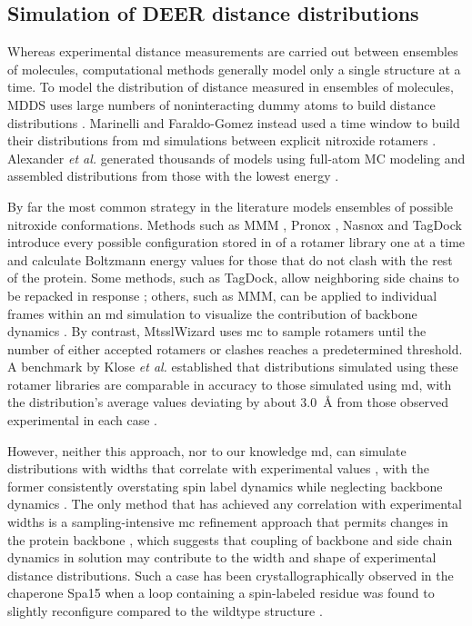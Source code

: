 \subsection{Simulation of DEER distance distributions}

Whereas experimental distance measurements are carried out between ensembles of molecules, computational methods generally model only a single structure at a time. To model the distribution of distance measured in ensembles of molecules, MDDS uses large numbers of noninteracting dummy atoms to build distance distributions \citep*{Kazmier2014a, Raghuraman2014}. Marinelli and Faraldo-Gomez instead used a time window to build their distributions from \gls{md} simulations between explicit nitroxide rotamers \citep*{Hustedt2018, Marinelli2015, Marinelli2019}. Alexander \emph{et al.} generated thousands of models using full-atom MC modeling and assembled distributions from those with the lowest energy \citep*{Alexander2013}.

By far the most common strategy in the literature models ensembles of possible nitroxide conformations. Methods such as MMM \citep*{Jeschke2018, Polyhach2011}, Pronox \citep*{Hatmal2012}, Nasnox \citep*{Beasley2015, Price2007, Tangprasertchai2015} and TagDock \citep*{Edwards2014} introduce every possible configuration stored in of a rotamer library one at a time and calculate Boltzmann energy values for those that do not clash with the rest of the protein. Some methods, such as TagDock, allow neighboring side chains to be repacked in response \citep*{Edwards2014}; others, such as MMM, can be applied to individual frames within an \gls{md} simulation to visualize the contribution of backbone dynamics \citep*{Stelzl2014, Tesei2020}. By contrast, MtsslWizard \citep*{Hagelueken2013, Hagelueken2012} uses \gls{mc} to sample rotamers until the number of either accepted rotamers or clashes reaches a predetermined threshold. A benchmark by Klose \emph{et al.} established that distributions simulated using these rotamer libraries are comparable in accuracy to those simulated using \gls{md}, with the distribution's average values deviating by about \SI{3.0}{\angstrom} from those observed experimental in each case \citep*{Klose2012}.

However, neither this approach, nor to our knowledge \gls{md}, can simulate distributions with widths that correlate with experimental values \citep*{Jeschke2013}, with the former consistently overstating spin label dynamics while neglecting backbone dynamics \citep*{Dastvan2016}. The only method that has achieved any correlation with experimental widths is a sampling-intensive \gls{mc} refinement approach that permits changes in the protein backbone \citep*{Alexander2013}, which suggests that coupling of backbone and side chain dynamics in solution may contribute to the width and shape of experimental distance distributions. Such a case has been crystallographically observed in the chaperone Spa15 when a loop containing a spin-labeled residue was found to slightly reconfigure compared to the wildtype structure \citep*{Lillington2011}.

